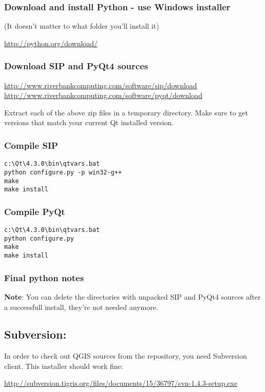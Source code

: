 \subsubsection{Download and install Python - use Windows installer}
(It doesn't matter to what folder you'll install it)

\url{http://python.org/download/}

\subsubsection{Download SIP and PyQt4 sources}
\url{http://www.riverbankcomputing.com/software/sip/download} \\
\url{http://www.riverbankcomputing.com/software/pyqt/download}

Extract each of the above zip files in a temporary directory. Make sure
to get versions that match your current Qt installed version.

\subsubsection{Compile SIP}
\begin{verbatim}
c:\Qt\4.3.0\bin\qtvars.bat 
python configure.py -p win32-g++ 
make 
make install 
\end{verbatim}

\subsubsection{Compile PyQt}
\begin{verbatim}
c:\Qt\4.3.0\bin\qtvars.bat 
python configure.py 
make 
make install 
\end{verbatim}

\subsubsection{Final python notes}
\textbf{Note}:  You can delete the directories with unpacked SIP and PyQt4 sources after a
successfull install, they're not needed anymore.

\subsection{Subversion:}
In order to check out QGIS sources from the repository, you need Subversion
client. This installer should work fine:

\url{http://subversion.tigris.org/files/documents/15/36797/svn-1.4.3-setup.exe}

